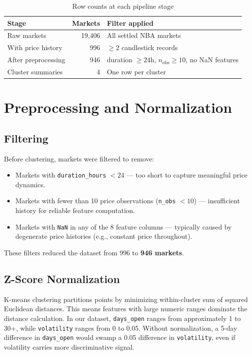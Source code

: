 \documentclass[11pt, a4paper]{article}
\begin{document}
\begin{table}[h!]
\centering
\caption{Row counts at each pipeline stage}
\begin{tabular}{lrl}
\toprule
Stage & Markets & Filter applied \\
\midrule
Raw markets & 19,406 & All settled NBA markets \\
With price history & 996 & $\geq 2$ candlestick records \\
After preprocessing & 946 & duration $\geq 24$h, $n_\text{obs} \geq 10$, no NaN features \\
Cluster summaries & 4 & One row per cluster \\
\bottomrule
\end{tabular}
\end{table}

\section{Preprocessing and Normalization}

\subsection{Filtering}
Before clustering, markets were filtered to remove:
\begin{itemize}[noitemsep]
  \item Markets with \texttt{duration\_hours} $< 24$ — too short to capture meaningful price dynamics.
  \item Markets with fewer than 10 price observations (\texttt{n\_obs} $< 10$) — insufficient history for reliable feature computation.
  \item Markets with \texttt{NaN} in any of the 8 feature columns — typically caused by degenerate price histories (e.g., constant price throughout).
\end{itemize}
These filters reduced the dataset from 996 to \textbf{946 markets}.

\subsection{Z-Score Normalization}
K-means clustering partitions points by minimizing within-cluster sum of squared Euclidean distances. This means features with large numeric ranges dominate the distance calculation. In our dataset, \texttt{days\_open} ranges from approximately 1 to 30+, while \texttt{volatility} ranges from 0 to 0.05. Without normalization, a 5-day difference in \texttt{days\_open} would swamp a 0.05 difference in \texttt{volatility}, even if volatility carries more discriminative signal.
\end{document}
